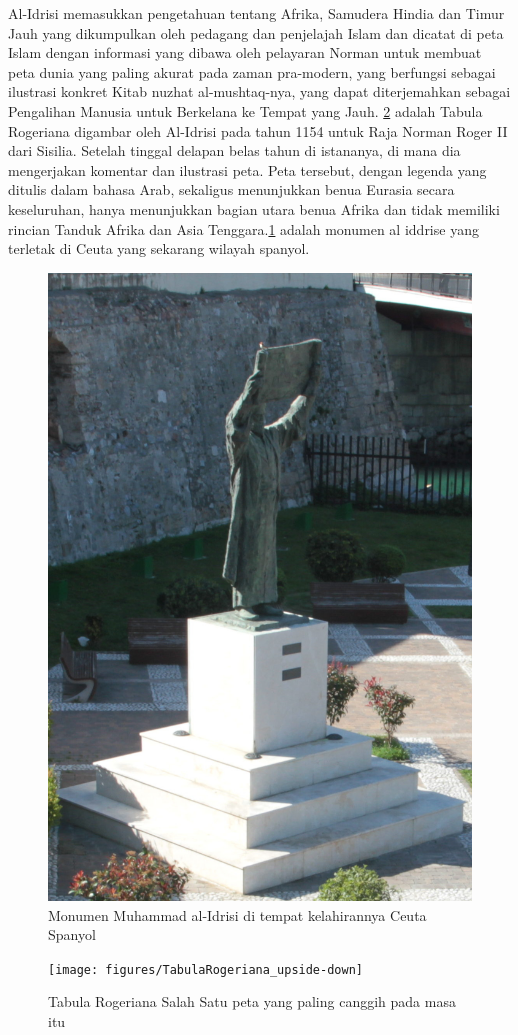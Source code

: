 	Al-Idrisi memasukkan pengetahuan tentang Afrika, Samudera Hindia dan Timur Jauh yang dikumpulkan oleh pedagang dan penjelajah Islam dan dicatat di peta Islam dengan informasi yang dibawa oleh pelayaran Norman untuk membuat peta dunia yang paling akurat pada zaman pra-modern, yang berfungsi sebagai ilustrasi konkret Kitab nuzhat al-mushtaq-nya, yang dapat diterjemahkan sebagai Pengalihan Manusia untuk Berkelana ke Tempat yang Jauh. 
	\ref{TabulaRogeriana_upside-down} adalah Tabula Rogeriana digambar oleh Al-Idrisi pada tahun 1154 untuk Raja Norman Roger II dari Sisilia. Setelah tinggal delapan belas tahun di istananya, di mana dia mengerjakan komentar dan ilustrasi peta. Peta tersebut, dengan legenda yang ditulis dalam bahasa Arab, sekaligus menunjukkan benua Eurasia secara keseluruhan, hanya menunjukkan bagian utara benua Afrika dan tidak memiliki rincian Tanduk Afrika dan Asia Tenggara.\ref{Fotoal-Idrisi} adalah monumen al iddrise yang terletak di Ceuta yang sekarang wilayah spanyol.
	\begin{figure} [ht]
	\centerline{\includegraphics[width=.5\textwidth]{figures/monumenaliddrisi}}
	\caption{Monumen Muhammad al-Idrisi di tempat kelahirannya Ceuta Spanyol}
	\label{Fotoal-Idrisi}
	\end{figure}
	 
	
	\begin{figure} [ht]
	\centerline{\texttt{[image: figures/TabulaRogeriana\_upside-down]}}
	\caption{Tabula Rogeriana Salah Satu peta yang paling canggih pada masa itu}
	\label{TabulaRogeriana_upside-down}
	\end{figure}
	

